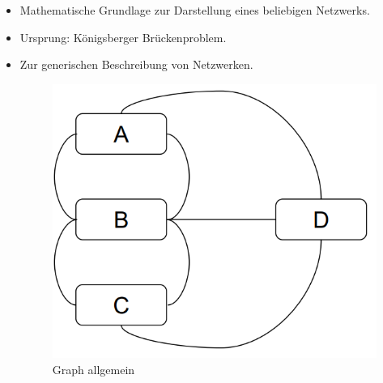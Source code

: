 \begin{itemize}
    \item Mathematische Grundlage zur Darstellung eines beliebigen Netzwerks.
    \item Ursprung: Königsberger Brückenproblem.
    \item Zur generischen Beschreibung von Netzwerken.
    
    \begin{figure}[H]
        \centering
        \includegraphics[width=0.6\linewidth]{Bilder/Teil3_Graph_Allgemein.png}
        \caption{Graph allgemein}
    \end{figure}


\end{itemize}
